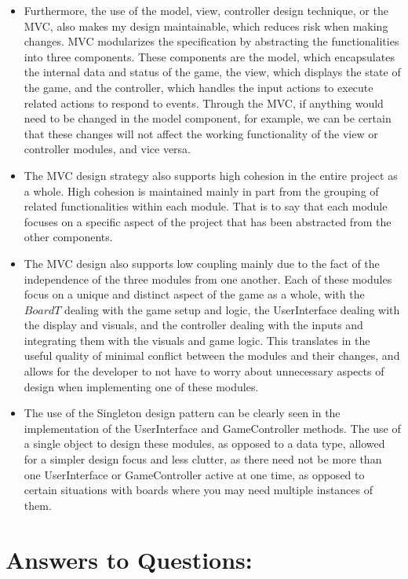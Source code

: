 \documentclass[12pt]{article}
\begin{document}
\begin{itemize}
  \item Furthermore, the use of the model, view, controller design technique, or the MVC, also makes my design maintainable, which reduces risk when making changes. MVC modularizes the specification by abstracting the functionalities into three
        components. These components are the model, which encapsulates the internal data and status of the game, the view, which displays the state of the game, and the controller, which handles
        the input actions to execute related actions to respond to events. Through the MVC, if anything would need to be changed in the model component, for example, we can be certain that these changes will not affect the working functionality of the view or controller modules, and vice versa.
  \item The MVC design strategy also supports high cohesion in the entire project as a whole. High cohesion is maintained mainly in part from the grouping of related functionalities within each module. That is to say that each module focuses on a specific aspect of the project that has been abstracted from the other components.

  \item The MVC design also supports low coupling mainly due to the fact of the independence of the three modules from one another. Each of these modules focus on a unique and distinct aspect of the game as a whole, with the $BoardT$ dealing with the game setup and logic, the UserInterface dealing with the display and visuals, and the controller dealing with the inputs and integrating them with the visuals and game logic. This translates in the useful quality of minimal conflict between the modules and their changes, and allows for the developer to not have to worry about unnecessary aspects of design when implementing one of these modules.

  \item The use of the Singleton design pattern can be clearly seen in the implementation of the UserInterface and GameController methods. The use of a single object to design these modules, as opposed to a data type, allowed for a simpler design focus and less clutter, as there need not be more than one UserInterface or GameController active at one time, as opposed to certain situations with boards where you may need multiple instances of them.

\end{itemize}

\newpage

\section*{Answers to Questions:}
\end{document}
